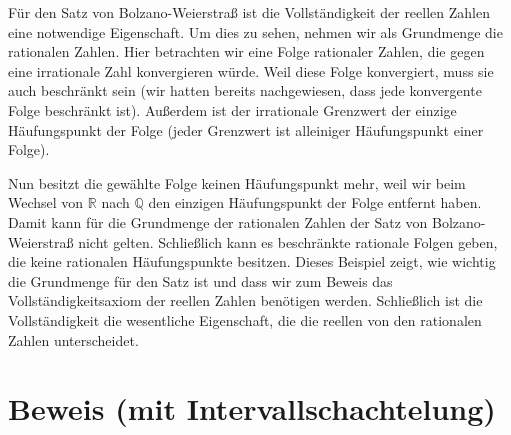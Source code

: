 \documentclass[fontsize=9pt,
               parskip=half-,
               DIV=14,
               listof=chapterentry,
               tocflat]{scrbook}
\begin{document}
Für den Satz von Bolzano-Weierstraß ist die Vollständigkeit der reellen Zahlen eine notwendige Eigenschaft. Um dies zu sehen, nehmen wir als Grundmenge die rationalen Zahlen. Hier betrachten wir eine Folge rationaler Zahlen, die gegen eine irrationale Zahl konvergieren würde. Weil diese Folge konvergiert, muss sie auch beschränkt sein (wir hatten bereits nachgewiesen, dass jede konvergente Folge beschränkt ist). Außerdem ist der irrationale Grenzwert der einzige Häufungspunkt der Folge (jeder Grenzwert ist alleiniger Häufungspunkt einer Folge).

Nun besitzt die gewählte Folge keinen Häufungspunkt mehr, weil wir beim Wechsel von $\mathbb {R} $ nach $\mathbb {Q} $ den einzigen Häufungspunkt der Folge entfernt haben. Damit kann für die Grundmenge der rationalen Zahlen der Satz von Bolzano-Weierstraß nicht gelten. Schließlich kann es beschränkte rationale Folgen geben, die keine rationalen Häufungspunkte besitzen. Dieses Beispiel zeigt, wie wichtig die Grundmenge für den Satz ist und dass wir zum Beweis das Vollständigkeitsaxiom der reellen Zahlen benötigen werden. Schließlich ist die Vollständigkeit die wesentliche Eigenschaft, die die reellen von den rationalen Zahlen unterscheidet.
\clearpage
\section{Beweis (mit Intervallschachtelung)}
\end{document}
